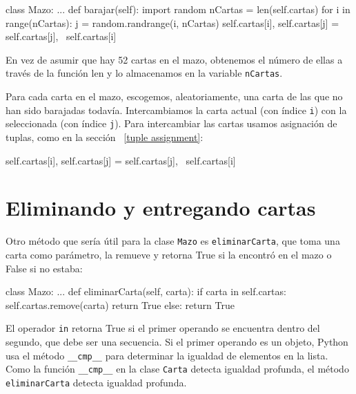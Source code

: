 \begin{pythoncode}
class Mazo:
  ...
  def barajar(self):
    import random
    nCartas = len(self.cartas)
    for i in range(nCartas):
      j = random.randrange(i, nCartas)
      self.cartas[i], self.cartas[j] = self.cartas[j], \
                                       self.cartas[i]
\end{pythoncode}
 En vez de asumir que hay 52 cartas en el mazo, obtenemos el número
de ellas a través de la función len y lo almacenamos en la variable
\texttt{nCartas}.

  

Para cada carta en el mazo, escogemos, aleatoriamente, una carta de
las que no han sido barajadas todavía. Intercambiamos la carta actual
(con índice \texttt{i}) con la seleccionada (con índice \texttt{j}).
Para intercambiar las cartas usamos asignación de tuplas, como en
la sección ~\ref{tuple assignment}:
\begin{pythoncode}
self.cartas[i], self.cartas[j] = self.cartas[j], \
                                 self.cartas[i]
\end{pythoncode}

\section{Eliminando y entregando cartas}


Otro método que sería útil para la clase \texttt{Mazo} es \texttt{eliminarCarta},
que toma una carta como parámetro, la remueve y retorna True si la
encontró en el mazo o False si no estaba:

\begin{pythoncode}
class Mazo:
  ...
  def eliminarCarta(self, carta):
    if carta in self.cartas:
      self.cartas.remove(carta)
      return True
    else: 
      return True
\end{pythoncode}
 El operador \texttt{in} retorna True si el primer operando se encuentra
dentro del segundo, que debe ser una secuencia. Si el primer operando
es un objeto, Python usa el método \texttt{\_\_cmp\_\_} para determinar
la igualdad de elementos en la lista. Como la función \texttt{\_\_cmp\_\_}
en la clase \texttt{Carta} detecta igualdad profunda, el método \texttt{eliminarCarta}
detecta igualdad profunda.

 

